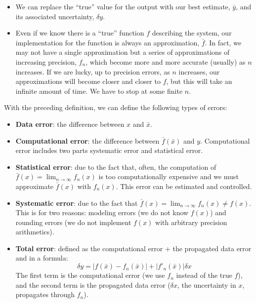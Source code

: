 \documentclass[justified, sixbynine]{tufte-book}
\theoremstyle{plain}%
\newtheorem * {corollary}{Corollary}
\theoremstyle{definition}
\theoremstyle{remark}
\newtheorem * {remark}{Remark}
\newtheorem * {note}{Note}
\begin{document}
\begin{fullwidth}
\begin{itemize}
\item We can replace the ``true'' value for the output with our best estimate, $\bar y$, and its associated uncertainty, $\delta y$.

\item Even if we know there is a ``true'' function $f$ describing the system, our implementation for the function is always an approximation, $\bar f$. In fact,  we may not have a single approximation but a series of approximations of increasing precision, $f_n$, which become more and more accurate (usually) as $n$ increases. If we are lucky, up to precision errors, as $n$ increases, our approximations will become closer and closer to $f$, but this will take an infinite amount of time. We have to stop at some finite $n$.
\end{itemize}


With the preceding definition, we can define the following types of errors:

\begin{itemize}
\item {\bf Data error}: the difference between $x$ and $\bar x$.

\item {\bf Computational error}: the difference between $\bar f(\bar x)$ and $y$.
Computational error includes two parts systematic error and statistical error.

\item {\bf Statistical error}: due to the fact that, often, the computation of $\bar f(x) = \lim_{n\rightarrow\infty} f_n(x)$ is too computationally expensive and we must approximate $\bar f(x)$ with $f_n(x)$. This error can be estimated and controlled.

\item {\bf Systematic error}: due to the fact that $\bar f(x) = \lim_{n\rightarrow\infty} f_n(x) \neq f(x)$. This is for two reasons: modeling errors (we do not know $f(x)$) and rounding errors (we do not implement $f(x)$ with arbitrary precision arithmetics).

\item {\bf Total error}: defined as the computational error + the propagated data error and in a formula:
\begin{equation}
\delta y = |f(\bar x)-f_n(\bar x)| + |f'_n(\bar x)|\delta x
\end{equation}
The first term is the computational error (we use $f_n$ instead of the true $f$), and the second term is the propagated data error ($\delta x$, the uncertainty in $x$, propagates through $f_n$).
\end{itemize}



\end{fullwidth}
\end{document}
